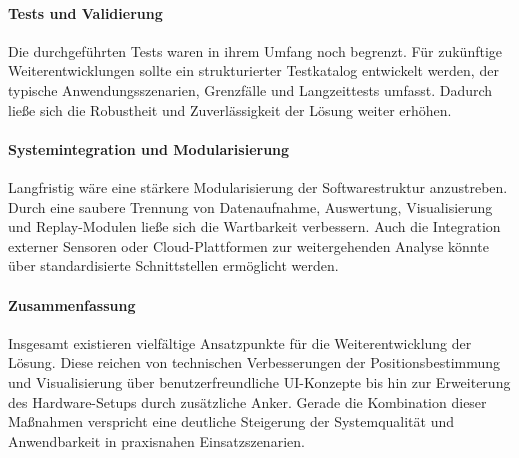 \documentclass[a4paper, 12pt]{article} %
\begin{document}
\paragraph{Tests und Validierung}
Die durchgeführten Tests waren in ihrem Umfang noch begrenzt. Für zukünftige Weiterentwicklungen sollte ein strukturierter Testkatalog 
entwickelt werden, der typische Anwendungsszenarien, Grenzfälle und Langzeittests umfasst. Dadurch ließe sich die Robustheit und Zuverlässigkeit 
der Lösung weiter erhöhen.

\paragraph{Systemintegration und Modularisierung}
Langfristig wäre eine stärkere Modularisierung der Softwarestruktur anzustreben. Durch eine saubere Trennung von Datenaufnahme, Auswertung, 
Visualisierung und Replay-Modulen ließe sich die Wartbarkeit verbessern. Auch die Integration externer Sensoren oder Cloud-Plattformen zur 
weitergehenden Analyse könnte über standardisierte Schnittstellen ermöglicht werden.

\paragraph{Zusammenfassung}
Insgesamt existieren vielfältige Ansatzpunkte für die Weiterentwicklung der Lösung. Diese reichen von technischen Verbesserungen der 
Positionsbestimmung und Visualisierung über benutzerfreundliche UI-Konzepte bis hin zur Erweiterung des Hardware-Setups durch zusätzliche Anker. 
Gerade die Kombination dieser Maßnahmen verspricht eine deutliche Steigerung der Systemqualität und Anwendbarkeit in praxisnahen Einsatzszenarien.





\clearpage
\begingroup
\renewcommand{\bibfont}{\fontsize{13pt}{12pt}\selectfont}  
\sloppy
\nocite{*}
\printbibliography
\endgroup
\end{document}

